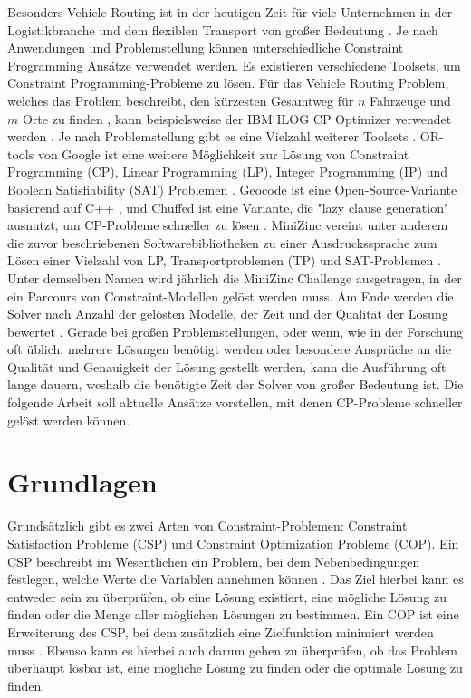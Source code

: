 Besonders Vehicle Routing ist in der heutigen Zeit für viele Unternehmen in der
Logistikbranche und dem flexiblen Transport von großer Bedeutung
\cite[1]{delec22jo}. Je nach Anwendungen und Problemstellung können
unterschiedliche Constraint Programming Ansätze verwendet werden. Es existieren
verschiedene Toolsets, um Constraint Programming-Probleme zu lösen. Für das
Vehicle Routing Problem, welches das Problem beschreibt, den kürzesten Gesamtweg
für \( n \) Fahrzeuge und \( m \) Orte zu finden \cite[222]{labor18jo}, kann
beispielsweise der IBM ILOG CP Optimizer verwendet werden \cite{IBMIwe}. Je nach
Problemstellung gibt es eine Vielzahl weiterer Toolsets \cite{Solviwea}.
OR-tools von Google ist eine weitere Möglichkeit zur Lösung von Constraint
Programming (CP), Linear Programming (LP), Integer Programming (IP) und Boolean
Satisfiability (SAT) Problemen \cite{ORToowe}. Geocode ist eine
Open-Source-Variante basierend auf C++ \cite{GECODwe}, und Chuffed ist eine
Variante, die "lazy clause generation" ausnutzt, um CP-Probleme schneller zu
lösen \cite{Chuff24co}. MiniZinc vereint unter anderem die zuvor beschriebenen
Softwarebibliotheken zu einer Ausdruckssprache zum Lösen einer Vielzahl von LP,
Transportproblemen (TP) und SAT-Problemen \cite{MiniZwe}. Unter demselben Namen
wird jährlich die MiniZinc Challenge ausgetragen, in der ein Parcours von
Constraint-Modellen gelöst werden muss. Am Ende werden die Solver nach Anzahl
der gelösten Modelle, der Zeit und der Qualität der Lösung bewertet
\cite{Homewe}. Gerade bei großen Problemstellungen, oder wenn, wie in der
Forschung oft üblich, mehrere Lösungen benötigt werden oder besondere Ansprüche
an die Qualität und Genauigkeit der Lösung gestellt werden, kann die Ausführung
oft lange dauern, weshalb die benötigte Zeit der Solver von großer Bedeutung
ist. Die folgende Arbeit soll aktuelle Ansätze vorstellen, mit denen CP-Probleme
schneller gelöst werden können.


\section{Grundlagen}
\label{sec:Grundlagen}
Grundsätzlich gibt es zwei Arten von Constraint-Problemen: Constraint
Satisfaction Probleme (CSP) und Constraint Optimization Probleme (COP). Ein CSP
beschreibt im Wesentlichen ein Problem, bei dem Nebenbedingungen festlegen,
welche Werte die Variablen annehmen können \cite[13]{rossi06bo}. Das Ziel
hierbei kann es entweder sein zu überprüfen, ob eine Lösung existiert, eine
mögliche Lösung zu finden oder die Menge aller möglichen Lösungen zu bestimmen.
Ein COP ist eine Erweiterung des CSP, bei dem zusätzlich eine Zielfunktion
minimiert werden muss \cite[171]{rossi06bo}. Ebenso kann es hierbei auch darum
gehen zu überprüfen, ob das Problem überhaupt lösbar ist, eine mögliche Lösung
zu finden oder die optimale Lösung zu finden.


